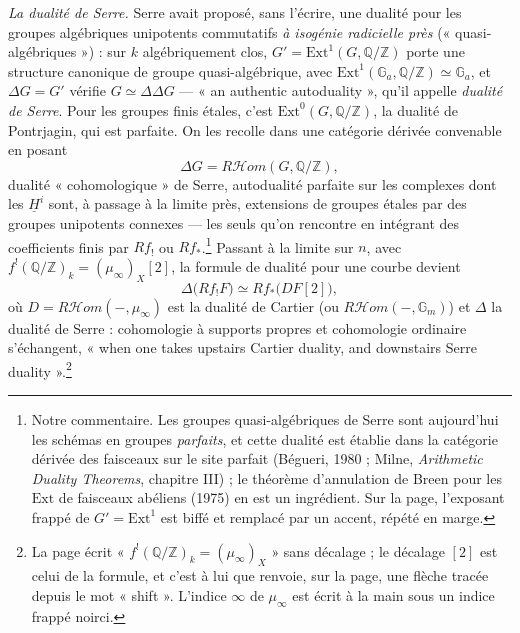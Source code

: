 \documentclass[11pt,a4paper]{article}
\begin{document}
\emph{La dualité de Serre.} Serre avait proposé, sans l'écrire, une dualité
pour les groupes algébriques unipotents commutatifs \emph{à isogénie
radicielle près} (« quasi-algébriques ») : sur $k$ algébriquement clos,
$G' = \mathrm{Ext}^1(G,\mathbb{Q}/\mathbb{Z})$ porte une structure canonique
de groupe quasi-algébrique, avec
$\mathrm{Ext}^1(\mathbb{G}_a,\mathbb{Q}/\mathbb{Z}) \simeq \mathbb{G}_a$, et
$\Delta G = G'$ vérifie $G \simeq \Delta\Delta G$ --- « an authentic
autoduality », qu'il appelle \emph{dualité de Serre}. Pour les groupes
finis étales, c'est $\mathrm{Ext}^0(G,\mathbb{Q}/\mathbb{Z})$, la dualité de
Pontrjagin, qui est parfaite. On les recolle dans une catégorie dérivée
convenable en posant
\[
\Delta G = R\mathcal{H}om(G,\mathbb{Q}/\mathbb{Z}),
\]
dualité « cohomologique » de Serre, autodualité parfaite sur les complexes
dont les $\underline{H}^i$ sont, à passage à la limite près, extensions de
groupes étales par des groupes unipotents connexes --- les seuls qu'on
rencontre en intégrant des coefficients finis par $Rf_!$ ou
$Rf_*$.\footnote{Notre commentaire. Les groupes quasi-algébriques de Serre
sont aujourd'hui les schémas en groupes \emph{parfaits}, et cette dualité
est établie dans la catégorie dérivée des faisceaux sur le site parfait
(Bégueri, 1980 ; Milne, \emph{Arithmetic Duality Theorems}, chapitre III) ;
le théorème d'annulation de Breen pour les $\mathrm{Ext}$ de faisceaux
abéliens (1975) en est un ingrédient. Sur la page, l'exposant frappé de
$G' = \mathrm{Ext}^1$ est biffé et remplacé par un accent, répété en
marge.} Passant à la limite sur $n$, avec $f^!(\mathbb{Q}/\mathbb{Z})_k
= (\mu_\infty)_X[2]$, la formule de dualité pour une courbe devient
\[
\Delta\bigl(Rf_!F\bigr) \simeq Rf_*\bigl(DF[2]\bigr),
\]
où $D = R\mathcal{H}om(-,\mu_\infty)$ est la dualité de Cartier (ou
$R\mathcal{H}om(-,\mathbb{G}_m)$) et $\Delta$ la dualité de Serre :
cohomologie à supports propres et cohomologie ordinaire s'échangent, « when
one takes upstairs Cartier duality, and downstairs Serre
duality ».\footnote{La page écrit
« $f^!(\mathbb{Q}/\mathbb{Z})_k = (\mu_\infty)_X$ » sans décalage ; le
décalage $[2]$ est celui de la formule, et c'est à lui que renvoie, sur la
page, une flèche tracée depuis le mot « shift ». L'indice $\infty$ de
$\mu_\infty$ est écrit à la main sous un indice frappé noirci.}
\end{document}
